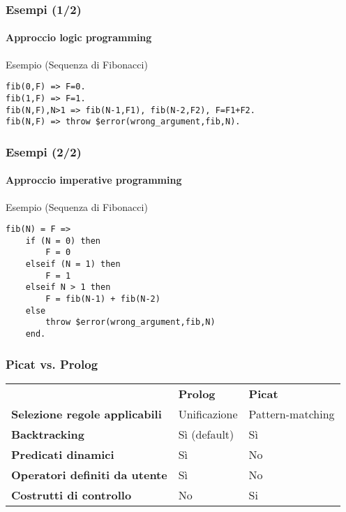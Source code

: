 \documentclass{beamer}
\begin{document}
\begin{frame}[fragile]
  \frametitle{Esempi (1/2)}
  \framesubtitle{Approccio logic programming}
  \begin{exampleblock}{Esempio (Sequenza di Fibonacci)}
\begin{verbatim}
fib(0,F) => F=0.
fib(1,F) => F=1.
fib(N,F),N>1 => fib(N-1,F1), fib(N-2,F2), F=F1+F2.
fib(N,F) => throw $error(wrong_argument,fib,N).
\end{verbatim}
  \end{exampleblock}
\end{frame}


\begin{frame}[fragile]
  \frametitle{Esempi (2/2)}
  \framesubtitle{Approccio imperative programming}
  \begin{exampleblock}{Esempio (Sequenza di Fibonacci)}
\begin{verbatim}
fib(N) = F =>
    if (N = 0) then
        F = 0
    elseif (N = 1) then
        F = 1
    elseif N > 1 then
        F = fib(N-1) + fib(N-2)
    else 
        throw $error(wrong_argument,fib,N)
    end.
\end{verbatim}
  \end{exampleblock}
\end{frame}


\begin{frame}[fragile]
  \frametitle{Picat vs. Prolog}
  \begin{table}
    \begin{tabular}{l l l}
      & \textbf{Prolog} & \textbf{Picat} \\
      \addlinespace
      \textbf{Selezione regole applicabili} & Unificazione & Pattern-matching \\
      \textbf{Backtracking} & Sì (default) & Sì \\
      \textbf{Predicati dinamici} & Sì & No \\
      \textbf{Operatori definiti da utente} & Sì & No \\
      \textbf{Costrutti di controllo} & No & Si
    \end{tabular}
  \end{table}
\end{frame}

\end{document}
